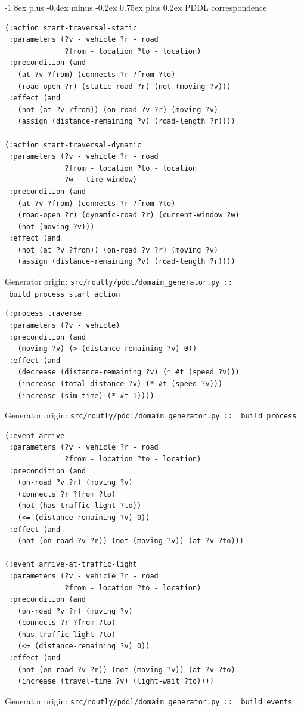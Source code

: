 \documentclass[11pt,a4paper]{article}
\makeatletter
\renewcommand{\subsection}{\@startsection{subsection}{2}{0pt}
  {-1.8ex plus -0.4ex minus -0.2ex}
  {0.75ex plus 0.2ex}
  {\normalfont\large\bfseries\color{RoutlyNavy}}}
\newcommand{\codeorigin}[1]{%
  {\footnotesize\textcolor{RoutlyMuted}{Generator origin: \texttt{#1}}\par}
}
\makeatother
\begin{document}
\subsection{PDDL correspondence}

\begin{lstlisting}
(:action start-traversal-static
 :parameters (?v - vehicle ?r - road
              ?from - location ?to - location)
 :precondition (and
   (at ?v ?from) (connects ?r ?from ?to)
   (road-open ?r) (static-road ?r) (not (moving ?v)))
 :effect (and
   (not (at ?v ?from)) (on-road ?v ?r) (moving ?v)
   (assign (distance-remaining ?v) (road-length ?r))))

(:action start-traversal-dynamic
 :parameters (?v - vehicle ?r - road
              ?from - location ?to - location
              ?w - time-window)
 :precondition (and
   (at ?v ?from) (connects ?r ?from ?to)
   (road-open ?r) (dynamic-road ?r) (current-window ?w)
   (not (moving ?v)))
 :effect (and
   (not (at ?v ?from)) (on-road ?v ?r) (moving ?v)
   (assign (distance-remaining ?v) (road-length ?r))))
\end{lstlisting}
\codeorigin{src/routly/pddl/domain\_generator.py :: \_build\_process\_start\_action}

\begin{lstlisting}
(:process traverse
 :parameters (?v - vehicle)
 :precondition (and
   (moving ?v) (> (distance-remaining ?v) 0))
 :effect (and
   (decrease (distance-remaining ?v) (* #t (speed ?v)))
   (increase (total-distance ?v) (* #t (speed ?v)))
   (increase (sim-time) (* #t 1))))
\end{lstlisting}
\codeorigin{src/routly/pddl/domain\_generator.py :: \_build\_process}

\begin{lstlisting}
(:event arrive
 :parameters (?v - vehicle ?r - road
              ?from - location ?to - location)
 :precondition (and
   (on-road ?v ?r) (moving ?v)
   (connects ?r ?from ?to)
   (not (has-traffic-light ?to))
   (<= (distance-remaining ?v) 0))
 :effect (and
   (not (on-road ?v ?r)) (not (moving ?v)) (at ?v ?to)))

(:event arrive-at-traffic-light
 :parameters (?v - vehicle ?r - road
              ?from - location ?to - location)
 :precondition (and
   (on-road ?v ?r) (moving ?v)
   (connects ?r ?from ?to)
   (has-traffic-light ?to)
   (<= (distance-remaining ?v) 0))
 :effect (and
   (not (on-road ?v ?r)) (not (moving ?v)) (at ?v ?to)
   (increase (travel-time ?v) (light-wait ?to))))
\end{lstlisting}
\codeorigin{src/routly/pddl/domain\_generator.py :: \_build\_events}
\end{document}
